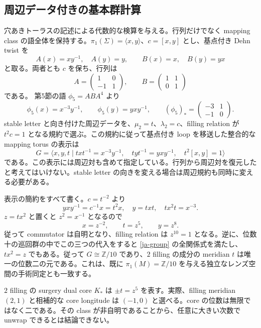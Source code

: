 \documentclass[12pt]{amsart}
\theoremstyle{definition}
\theoremstyle{remark}
\numberwithin{equation}{section}
\newcommand{\Z}{\mathbb{Z}}
\theoremstyle{definition}
\begin{document}
\subsection{周辺データ付きの基本群計算}
穴あきトーラスの記述による代数的な検算を与える。行列だけでなく mapping class の語全体を保持する。$\pi_1(\Sigma)=\langle x,y\rangle$、$c=[x,y]$ とし、基点付き Dehn twist を
\[
A(x)=xy^{-1},\quad A(y)=y,\qquad B(x)=x,\quad B(y)=yx
\]
と取る。両者とも $c$ を保ち、行列は
\[
A=\begin{pmatrix}1&0\\-1&1\end{pmatrix},\qquad
B=\begin{pmatrix}1&1\\0&1\end{pmatrix}
\]
である。\cite{ja-MN} 第5節の語 $\phi_5=ABA^4$ より
\[
\phi_5(x)=x^{-3}y^{-1},\qquad \phi_5(y)=yxy^{-1},\qquad
(\phi_5)_*=\begin{pmatrix}-3&1\\-1&0\end{pmatrix}.
\]
stable letter と向き付けた周辺データを、$\mu_2=t$、$\lambda_2=c$、filling relation が $t^2c=1$ となる規約で選ぶ。この規約に従って基点付き loop を移送した整合的な mapping torus の表示は
\begin{equation}\label{ja-group}
G=\langle x,y,t\mid txt^{-1}=x^{-3}y^{-1},\quad
tyt^{-1}=yxy^{-1},\quad t^2[x,y]=1\rangle
\end{equation}
である。この表示には周辺対も含めて指定している。行列から周辺対を復元したと考えてはいけない。stable letter の向きを変える場合は周辺規約も同時に変える必要がある。

表示の簡約をすべて書く。$c=t^{-2}$ より
\[
yxy^{-1}=c^{-1}x=t^2x,\quad y=txt,\quad tx^2t=x^{-3}.
\]
$z=tx^2$ と置くと $z^2=x^{-1}$ となるので
\begin{equation}\label{ja-tietze}
x=z^{-2},\qquad t=z^5,\qquad y=z^8.
\end{equation}
従って commutator は自明となり、filling relation は $z^{10}=1$ となる。逆に、位数十の巡回群の中でこの三つの代入をすると \eqref{ja-group} の全関係式を満たし、$tx^2=z$ でもある。従って $G\cong\Z/10$ であり、$2$ filling の成分の meridian $t$ は唯一の位数二の元である。これは、既に $\pi_1(M)=\Z/10$ を与える独立なレンズ空間の手術同定とも一致する。

$2$ filling の surgery dual core $K_*$ は $\pm t=z^5$ を表す。実際、filling meridian $(2,1)$ と相補的な core longitude は $(-1,0)$ と選べる。core の位数は無限ではなく二である。その class が非自明であることから、任意に大きい次数で unwrap できるとは結論できない。
\end{document}
